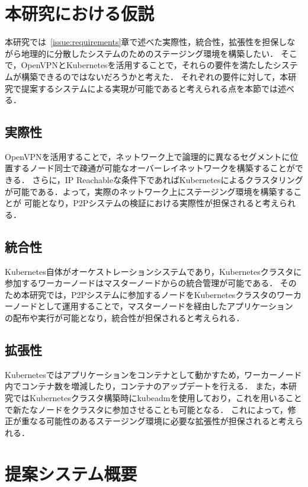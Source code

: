 \section{本研究における仮説}
\label{issue:hypothesis}

本研究では~\ref{issue:requirements}章で述べた実際性，統合性，拡張性を担保しながら地理的に分散したシステムのためのステージング環境を構築したい．
そこで，OpenVPNとKubernetesを活用することで，それらの要件を満たしたシステムが構築できるのではないだろうかと考えた．
それぞれの要件に対して，本研究で提案するシステムによる実現が可能であると考えられる点を本節では述べる．

\subsection{実際性}

OpenVPNを活用することで，ネットワーク上で論理的に異なるセグメントに位置するノード同士で疎通が可能なオーバーレイネットワークを構築することができる．
さらに，IP Reachableな条件下であればKubernetesによるクラスタリングが可能である．よって，実際のネットワーク上にステージング環境を構築することが
可能となり，P2Pシステムの検証における実際性が担保されると考えられる．

\subsection{統合性}

Kubernetes自体がオーケストレーションシステムであり，Kubernetesクラスタに参加するワーカーノードはマスターノードからの統合管理が可能である．
そのため本研究では，P2Pシステムに参加するノードをKubernetesクラスタのワーカーノードとして運用することで，マスターノードを経由したアプリケーション
の配布や実行が可能となり，統合性が担保されると考えられる．

\subsection{拡張性}

Kubernetesではアプリケーションをコンテナとして動かすため，ワーカーノード内でコンテナ数を増減したり，コンテナのアップデートを行える．
また，本研究ではKubernetesクラスタ構築時にkubeadmを使用しており，これを用いることで新たなノードをクラスタに参加させることも可能となる．
これによって，修正が重なる可能性のあるステージング環境に必要な拡張性が担保されると考えられる．

\section{提案システム概要}
\label{issue:about-system}

